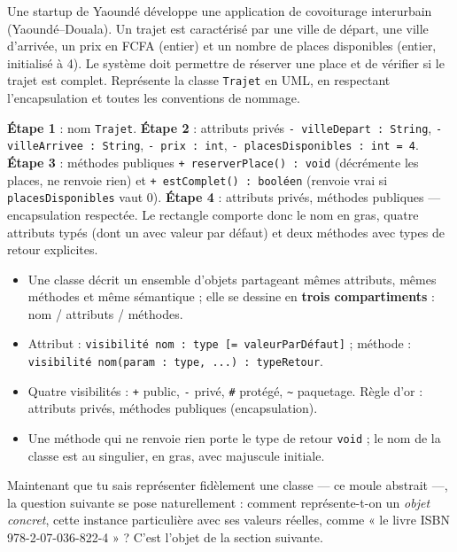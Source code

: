 \documentclass[11pt]{article}
\newcommand{\cle}[1]{{\popxbold\color{popdark}#1}}
\begin{document}
\begin{exercice}
Une startup de Yaoundé développe une application de covoiturage interurbain (Yaoundé–Douala). Un trajet est caractérisé par une ville de départ, une ville d'arrivée, un prix en FCFA (entier) et un nombre de places disponibles (entier, initialisé à 4). Le système doit permettre de réserver une place et de vérifier si le trajet est complet. Représente la classe \texttt{Trajet} en UML, en respectant l'encapsulation et toutes les conventions de nommage.
\end{exercice}

\begin{corrige}
\textbf{Étape 1} : nom \texttt{Trajet}. \textbf{Étape 2} : attributs privés \texttt{- villeDepart : String}, \texttt{- villeArrivee : String}, \texttt{- prix : int}, \texttt{- placesDisponibles : int = 4}. \textbf{Étape 3} : méthodes publiques \texttt{+ reserverPlace() : void} (décrémente les places, ne renvoie rien) et \texttt{+ estComplet() : bool\'een} (renvoie vrai si \texttt{placesDisponibles} vaut 0). \textbf{Étape 4} : attributs privés, méthodes publiques — encapsulation respectée. Le rectangle comporte donc le nom en gras, quatre attributs typés (dont un avec valeur par défaut) et deux méthodes avec types de retour explicites.
\end{corrige}

\begin{aretenir}
\begin{itemize}
\item Une \cle{classe} décrit un ensemble d'objets partageant mêmes attributs, mêmes méthodes et même sémantique ; elle se dessine en \textbf{trois compartiments} : nom / attributs / méthodes.
\item Attribut : \texttt{visibilit\'e nom : type [= valeurParD\'efaut]} ; méthode : \texttt{visibilit\'e nom(param : type, ...) : typeRetour}.
\item Quatre visibilités : \texttt{+} public, \texttt{-} privé, \texttt{\#} protégé, \texttt{\textasciitilde} paquetage. Règle d'or : attributs privés, méthodes publiques (encapsulation).
\item Une méthode qui ne renvoie rien porte le type de retour \texttt{void} ; le nom de la classe est au singulier, en gras, avec majuscule initiale.
\end{itemize}
\end{aretenir}

Maintenant que tu sais représenter fidèlement une classe — ce moule abstrait —, la question suivante se pose naturellement : comment représente-t-on un \emph{objet concret}, cette instance particulière avec ses valeurs réelles, comme « le livre ISBN 978-2-07-036-822-4 » ? C'est l'objet de la section suivante.
\end{document}
